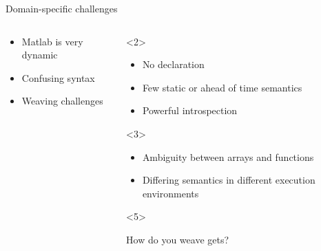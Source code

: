 \begin{frame}{Domain-specific challenges}
  \begin{columns}
    \begin{column}{5cm}
      \begin{itemize}
      \item<alert@2> Matlab is very dynamic
      \item<alert@3> Confusing syntax
      \item<alert@4-> Weaving challenges
      \end{itemize}
    \end{column}
    \begin{column}{5cm}
      \begin{onlyenv}<2>
        \begin{block}{}
          \begin{itemize}
          \item No declaration 
          \item Few static or ahead of time semantics
          \item Powerful introspection
          \end{itemize}
        \end{block}
      \end{onlyenv}
      \begin{onlyenv}<3>
        \begin{block}{}
          \begin{itemize}
          \item Ambiguity between arrays and functions
          \item Differing semantics in different execution
            environments
          \end{itemize}
        \end{block}
      \end{onlyenv}
      \begin{onlyenv}<5>
        \begin{block}{}
          How do you weave gets?
        \end{block}
      \end{onlyenv}
    \end{column}
  \end{columns}
\end{frame}
